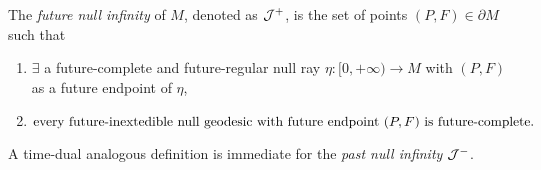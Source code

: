 \begin{definition}
\label{scri}
The {\em future null infinity} of $M$, denoted as ${\cal J}^+$, is the set of points $(P,F) \in \partial  M$ such that
\begin{enumerate}[label=(\roman*)]
\item $\exists$ a future-complete and future-regular null ray $\eta:[0,+\infty) \rightarrow M$ with $(P,F)$ as a future endpoint of $\eta$,

\item $\mbox{every future-inextedible null geodesic with future endpoint $(P,F)$ is fu\-tu\-re-com\-ple\-te.}$
\end{enumerate}
A time-dual analogous definition is immediate for the \emph{past null infinity} ${\cal J}^-$.
\end{definition}



